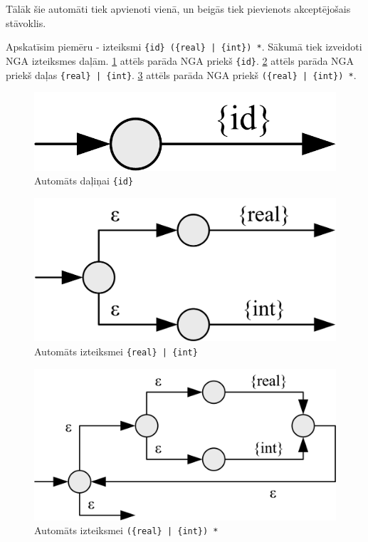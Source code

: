 Tālāk šie automāti tiek apvienoti vienā, un beigās tiek pievienots akceptējošais stāvoklis.

Apskatīsim piemēru - izteiksmi \verb/{id} ({real} | {int}) */. Sākumā tiek izveidoti NGA izteiksmes daļām. \ref{fig:auto_token_id} attēls parāda NGA priekš \verb|{id}|. \ref{fig:auto_or_ex} attēls parāda NGA priekš daļas \verb/{real} | {int}/. \ref{fig:auto_asterisk_ex} attēls parāda NGA priekš \verb/({real} | {int}) */.

\begin{figure}[H]
  \centering
    \includegraphics[scale=1.5]{pictures/auto_token_id}
  \caption{\label{fig:auto_token_id}Automāts daļiņai \texttt{\{id\}}}
\end{figure}

\begin{figure}[H]
  \centering
    \includegraphics[scale=1.5]{pictures/auto_or_ex}
  \caption{\label{fig:auto_or_ex}Automāts izteiksmei \texttt{\{real\} | \{int\}}}
\end{figure}

\begin{figure}[H]
  \centering
    \includegraphics[scale=1.5]{pictures/auto_asterisk_ex}
  \caption{\label{fig:auto_asterisk_ex}Automāts izteiksmei \texttt{(\{real\} | \{int\}) *}}
\end{figure}

